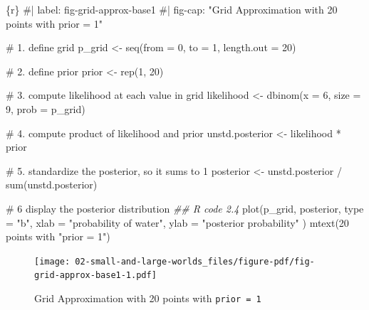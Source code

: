 \documentclass[
  letterpaper,
  DIV=11,
  numbers=noendperiod]{scrreprt}
\newenvironment{Shaded}{\begin{snugshade}}{\end{snugshade}}
\newcommand{\AttributeTok}[1]{\textcolor[rgb]{0.40,0.45,0.13}{#1}}
\newcommand{\CommentTok}[1]{\textcolor[rgb]{0.37,0.37,0.37}{#1}}
\newcommand{\DecValTok}[1]{\textcolor[rgb]{0.68,0.00,0.00}{#1}}
\newcommand{\DocumentationTok}[1]{\textcolor[rgb]{0.37,0.37,0.37}{\textit{#1}}}
\newcommand{\FunctionTok}[1]{\textcolor[rgb]{0.28,0.35,0.67}{#1}}
\newcommand{\InformationTok}[1]{\textcolor[rgb]{0.37,0.37,0.37}{#1}}
\newcommand{\NormalTok}[1]{\textcolor[rgb]{0.00,0.23,0.31}{#1}}
\newcommand{\OtherTok}[1]{\textcolor[rgb]{0.00,0.23,0.31}{#1}}
\newcommand{\SpecialCharTok}[1]{\textcolor[rgb]{0.37,0.37,0.37}{#1}}
\newcommand{\StringTok}[1]{\textcolor[rgb]{0.13,0.47,0.30}{#1}}
\begin{document}
\begin{Shaded}
\begin{Highlighting}[]
\InformationTok{\textasciigrave{}\textasciigrave{}\textasciigrave{}\{r\}}
\CommentTok{\#| label: fig{-}grid{-}approx{-}base1}
\CommentTok{\#| fig{-}cap: "Grid Approximation with 20 points with \textasciigrave{}prior = 1\textasciigrave{}"}

\CommentTok{\# 1. define grid}
\NormalTok{p\_grid }\OtherTok{\textless{}{-}} \FunctionTok{seq}\NormalTok{(}\AttributeTok{from =} \DecValTok{0}\NormalTok{, }\AttributeTok{to =} \DecValTok{1}\NormalTok{, }\AttributeTok{length.out =} \DecValTok{20}\NormalTok{)}

\CommentTok{\# 2. define prior}
\NormalTok{prior }\OtherTok{\textless{}{-}} \FunctionTok{rep}\NormalTok{(}\DecValTok{1}\NormalTok{, }\DecValTok{20}\NormalTok{)}

\CommentTok{\# 3. compute likelihood at each value in grid}
\NormalTok{likelihood }\OtherTok{\textless{}{-}} \FunctionTok{dbinom}\NormalTok{(}\AttributeTok{x =} \DecValTok{6}\NormalTok{, }\AttributeTok{size =} \DecValTok{9}\NormalTok{, }\AttributeTok{prob =}\NormalTok{ p\_grid)}

\CommentTok{\# 4. compute product of likelihood and prior}
\NormalTok{unstd.posterior }\OtherTok{\textless{}{-}}\NormalTok{ likelihood }\SpecialCharTok{*}\NormalTok{ prior}

\CommentTok{\# 5. standardize the posterior, so it sums to 1}
\NormalTok{posterior }\OtherTok{\textless{}{-}}\NormalTok{ unstd.posterior }\SpecialCharTok{/} \FunctionTok{sum}\NormalTok{(unstd.posterior)}

\CommentTok{\# 6 display the posterior distribution}
\DocumentationTok{\#\# R code 2.4}
\FunctionTok{plot}\NormalTok{(p\_grid, posterior,}
  \AttributeTok{type =} \StringTok{"b"}\NormalTok{,}
  \AttributeTok{xlab =} \StringTok{"probability of water"}\NormalTok{, }\AttributeTok{ylab =} \StringTok{"posterior probability"}
\NormalTok{)}
\FunctionTok{mtext}\NormalTok{(}\StringTok{\textquotesingle{}20 points with "prior = 1"\textquotesingle{}}\NormalTok{)}

\InformationTok{\textasciigrave{}\textasciigrave{}\textasciigrave{}}
\end{Highlighting}
\end{Shaded}

\begin{figure}[H]

{\centering \texttt{[image: 02-small-and-large-worlds\_files/figure-pdf/fig-grid-approx-base1-1.pdf]}

}

\caption{\label{fig-grid-approx-base1}Grid Approximation with 20 points
with \texttt{prior\ =\ 1}}

\end{figure}
\end{document}
